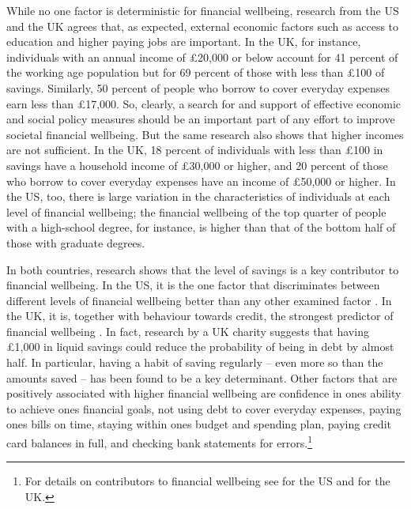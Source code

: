 While no one factor is deterministic for financial wellbeing, research from the
US \citep{cfpb2017financial} and the UK \citep{mps2018building} agrees that, as
expected, external economic factors such as access to education and higher
paying jobs are important. In the UK, for instance, individuals with an annual
income of \pounds20,000 or below account for 41 percent of the working age
population but for 69 percent of those with less than \pounds100 of savings.
Similarly, 50 percent of people who borrow to cover everyday expenses earn less
than \pounds17,000. So, clearly, a search for and support of effective economic
and social policy measures should be an important part of any effort to improve
societal financial wellbeing. But the same research also shows that higher
incomes are not sufficient. In the UK, 18 percent of individuals with less than
\pounds 100 in savings have a household income of \pounds30,000 or higher, and
20 percent of those who borrow to cover everyday expenses have an income of
\pounds50,000 or higher. In the US, too, there is large variation in the
characteristics of individuals at each level of financial wellbeing; the
financial wellbeing of the top quarter of people with a high-school degree, for
instance, is higher than that of the bottom half of those with graduate
degrees.

In both countries, research shows that the level of savings is a key
contributor to financial wellbeing. In the US, it is the one factor that
discriminates between different levels of financial wellbeing better than any
other examined factor \citep{cfpb2017financial}. In the UK, it is, together
with behaviour towards credit, the strongest predictor of financial wellbeing
\citep{mps2018building}. In fact, research by a UK charity suggests that having
\pounds1,000 in liquid savings could reduce the probability of being in debt by
almost half. In particular, having a habit of saving regularly -- even more so
than the amounts saved -- has been found to be a key determinant. Other
factors that are positively associated with higher financial wellbeing are
confidence in ones ability to achieve ones financial goals, not using debt to
cover everyday expenses, paying ones bills on time, staying within ones budget
and spending plan, paying credit card balances in full, and checking bank
statements for errors.\footnote{For details on contributors to financial
wellbeing see \citep{cfpb2017financial} for the US and \citet{mps2018building}
for the UK.}

